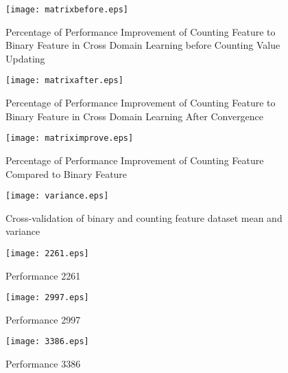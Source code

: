 \begin{figure}[t]
\centering
\texttt{[image: matrixbefore.eps]}
\caption{Percentage of Performance Improvement of Counting Feature to Binary Feature in Cross Domain Learning before Counting Value Updating}
\label{fig:matrixbefore}
\end{figure}

\begin{figure}[t]
\centering
\texttt{[image: matrixafter.eps]}
\caption{Percentage of Performance Improvement of Counting Feature to Binary Feature in Cross Domain Learning After Convergence}
\label{fig:matrixafter}
\end{figure}

\begin{figure}[t]
\centering
\texttt{[image: matriximprove.eps]}
\caption{Percentage of Performance Improvement of Counting Feature Compared to Binary Feature}
\label{fig:matriximprove}
\end{figure}


\begin{figure}[t]
\centering
\texttt{[image: variance.eps]}
\caption{Cross-validation of binary and counting feature dataset mean and variance}
\label{fig:variance}
\end{figure}

\begin{figure}[t]
\centering
\texttt{[image: 2261.eps]}
\caption{Performance 2261}
\label{fig:2261}
\end{figure}

\begin{figure}[t]
\centering
\texttt{[image: 2997.eps]}
\caption{Performance 2997}
\label{fig:2997}
\end{figure}

\begin{figure}[t]
\centering
\texttt{[image: 3386.eps]}
\caption{Performance 3386}
\label{fig:3386}
\end{figure}




